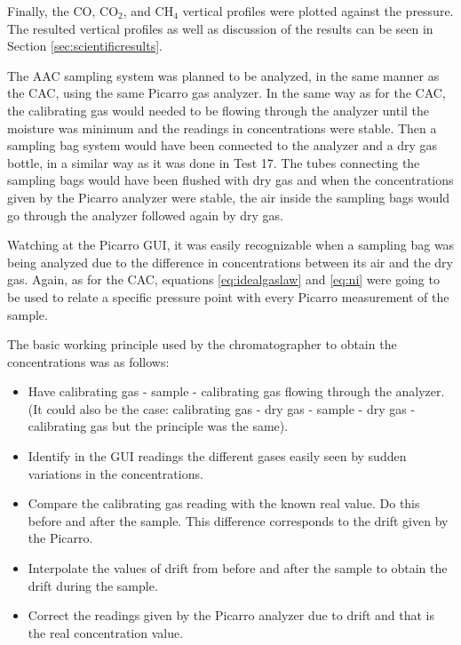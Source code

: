 
Finally, the CO, CO$_2$, and CH$_4$ vertical profiles were plotted against the pressure. The resulted vertical profiles as well as discussion of the results can be seen in Section \ref{sec:scientificresults}.



The AAC sampling system was planned to be analyzed, in the same manner as the CAC, using the same Picarro gas analyzer. In the same way as for the CAC, the calibrating gas would needed to be flowing through the analyzer until the moisture was minimum and the readings in concentrations were stable. Then a sampling bag system would have been connected to the analyzer and a dry gas bottle, in a similar way as it was done in Test 17. The tubes connecting the sampling bags would have been flushed with dry gas and when the concentrations given by the Picarro analyzer were stable, the air inside the sampling bags would go through the analyzer followed again by dry gas.  

Watching at the Picarro GUI, it was easily recognizable when a sampling bag was being analyzed due to the difference in concentrations between its air and the dry gas. Again, as for the CAC, equations \ref{eq:idealgaslaw} and \ref{eq:ni} were going to be used to relate a specific pressure point with every Picarro measurement of the sample. 


The basic working principle used by the chromatographer to obtain the concentrations was as follows:
\begin{itemize}
    \item Have calibrating gas - sample - calibrating gas flowing through the analyzer. (It could also be the case: calibrating gas - dry gas - sample - dry gas - calibrating gas but the principle was the same). 
    \item Identify in the GUI readings the different gases easily seen by sudden variations in the concentrations. 
    \item Compare the calibrating gas reading with the known real value. Do this before and after the sample. This difference corresponds to the drift given by the Picarro. 
    \item Interpolate the values of drift from before and after the sample to obtain the drift during the sample. 
    \item Correct the readings given by the Picarro analyzer due to drift and that is the real concentration value. 
\end{itemize}

